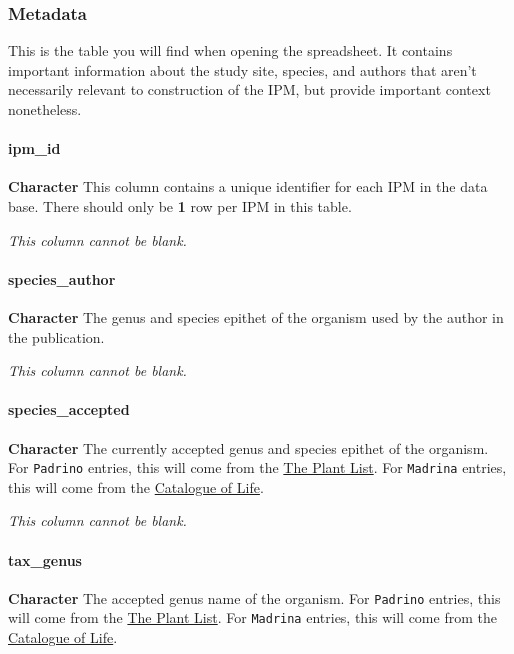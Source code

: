 \documentclass[]{article}
\let\oldparagraph\paragraph
\renewcommand{\paragraph}[1]{\oldparagraph{#1}\mbox{}}
\begin{document}
\subsubsection{Metadata}\label{metadata}

This is the table you will find when opening the spreadsheet. It
contains important information about the study site, species, and
authors that aren't necessarily relevant to construction of the IPM, but
provide important context nonetheless.

\paragraph{ipm\_id}\label{ipm_id}

\textbf{Character} This column contains a unique identifier for each IPM
in the data base. There should only be \textbf{1} row per IPM in this
table.

\emph{This column cannot be blank.}

\paragraph{species\_author}\label{species_author}

\textbf{Character} The genus and species epithet of the organism used by
the author in the publication.

\emph{This column cannot be blank.}

\paragraph{species\_accepted}\label{species_accepted}

\textbf{Character} The currently accepted genus and species epithet of
the organism. For \texttt{Padrino} entries, this will come from the
\href{http://www.theplantlist.org/}{The Plant List}. For
\texttt{Madrina} entries, this will come from the
\href{http://www.catalogueoflife.org/}{Catalogue of Life}.

\emph{This column cannot be blank.}

\paragraph{tax\_genus}\label{tax_genus}

\textbf{Character} The accepted genus name of the organism. For
\texttt{Padrino} entries, this will come from the
\href{http://www.theplantlist.org/}{The Plant List}. For
\texttt{Madrina} entries, this will come from the
\href{http://www.catalogueoflife.org/}{Catalogue of Life}.
\end{document}
